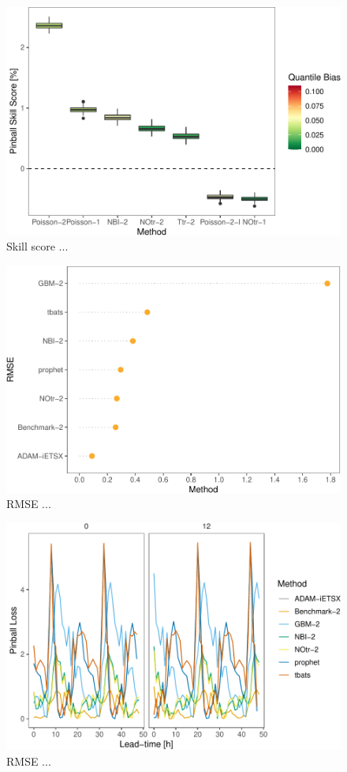 \documentclass[]{elsarticle} %
\begin{document}
\begin{figure}[H]

{\centering \includegraphics[width=0.7\linewidth]{paper_files/figure-latex/Skill-rel2bench-reduced-1} 

}

\caption{Skill score ...}\label{fig:Skill-rel2bench-reduced}
\end{figure}

\begin{figure}[H]

{\centering \includegraphics[width=0.7\linewidth]{paper_files/figure-latex/rmse-1} 

}

\caption{RMSE ...}\label{fig:rmse}
\end{figure}

\begin{figure}[H]

{\centering \includegraphics[width=0.7\linewidth]{paper_files/figure-latex/lead-time-rmse-1} 

}

\caption{RMSE ...}\label{fig:lead-time-rmse}
\end{figure}
\end{document}
